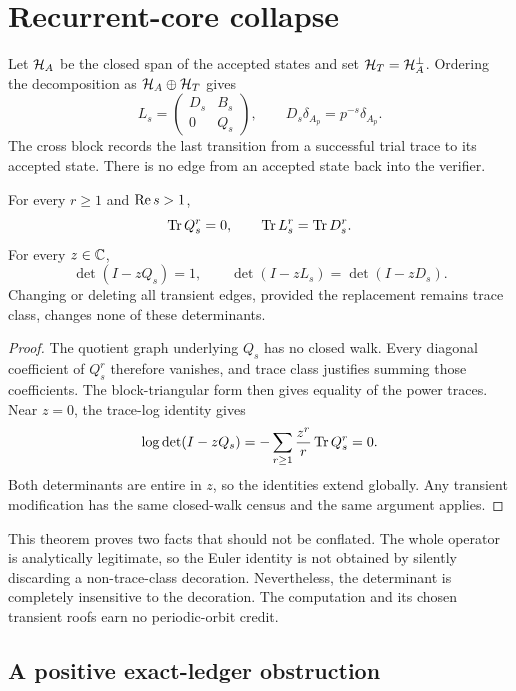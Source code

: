\section{Recurrent-core collapse}
\label{sec:pruning}

Let $\mathcal H_A$ be the closed span of the accepted states and set
$\mathcal H_T=\mathcal H_A^\perp$.  Ordering the decomposition as $\mathcal H_A\oplus\mathcal H_T$ gives
\begin{equation}
L_s=
\begin{pmatrix}
D_s&B_s\\
0&Q_s
\end{pmatrix},
\qquad
D_s\delta_{A_p}=p^{-s}\delta_{A_p}.
\label{eq:block}
\end{equation}
The cross block records the last transition from a successful trial trace to
its accepted state.  There is no edge from an accepted state back into the
verifier.

\begin{theorem}
\label{thm:invisibility}
For every $r\ge1$ and $\operatorname{Re} s>1$,
\[
\operatorname{Tr} Q_s^r=0,
\qquad
\operatorname{Tr} L_s^r=\operatorname{Tr} D_s^r.
\]
For every $z\in\mathbb C$,
\[
\det(I-zQ_s)=1,
\qquad
\det(I-zL_s)=\det(I-zD_s).
\]
Changing or deleting all transient edges, provided the replacement remains
trace class, changes none of these determinants.
\end{theorem}

\begin{proof}
The quotient graph underlying $Q_s$ has no closed walk.  Every diagonal
coefficient of $Q_s^r$ therefore vanishes, and trace class justifies summing
those coefficients.  The block-triangular form then gives equality of the
power traces.  Near $z=0$, the trace-log identity gives
\[
\log\det(I-zQ_s)
=-\sum_{r\ge1}\frac{z^r}{r}\operatorname{Tr} Q_s^r=0.
\]
Both determinants are entire in $z$, so the identities extend globally.
Any transient modification has the same closed-walk census and the same
argument applies.
\end{proof}

This theorem proves two facts that should not be conflated.  The whole
operator is analytically legitimate, so the Euler identity is not obtained
by silently discarding a non-trace-class decoration.  Nevertheless, the
determinant is completely insensitive to the decoration.  The computation
and its chosen transient roofs earn no periodic-orbit credit.

\subsection{A positive exact-ledger obstruction}

